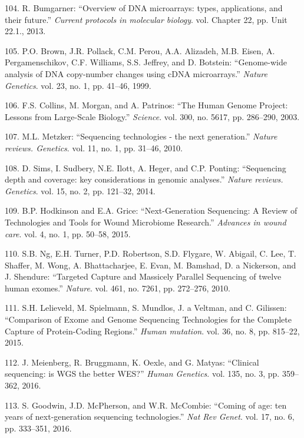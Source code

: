 \documentclass[12pt,a4paper,twoside]{ugathesis}
\theoremstyle{definition}
\theoremstyle{definition}
\theoremstyle{definition}
\theoremstyle{remark}
\begin{document}
\hypertarget{ref-Bumgarner2013}{}
104. R. Bumgarner: ``Overview of DNA microarrays: types, applications,
and their future.'' \emph{Current protocols in molecular biology}. vol.
Chapter 22, pp. Unit 22.1., 2013.

\hypertarget{ref-Brown1999}{}
105. P.O. Brown, J.R. Pollack, C.M. Perou, A.A. Alizadeh, M.B. Eisen, A.
Pergamenschikov, C.F. Williams, S.S. Jeffrey, and D. Botstein:
``Genome-wide analysis of DNA copy-number changes using cDNA
microarrays.'' \emph{Nature Genetics}. vol. 23, no. 1, pp. 41--46, 1999.

\hypertarget{ref-Collins2003}{}
106. F.S. Collins, M. Morgan, and A. Patrinos: ``The Human Genome
Project: Lessons from Large-Scale Biology.'' \emph{Science}. vol. 300,
no. 5617, pp. 286--290, 2003.

\hypertarget{ref-Metzker2010}{}
107. M.L. Metzker: ``Sequencing technologies - the next generation.''
\emph{Nature reviews. Genetics}. vol. 11, no. 1, pp. 31--46, 2010.

\hypertarget{ref-Sims2014}{}
108. D. Sims, I. Sudbery, N.E. Ilott, A. Heger, and C.P. Ponting:
``Sequencing depth and coverage: key considerations in genomic
analyses.'' \emph{Nature reviews. Genetics}. vol. 15, no. 2, pp.
121--32, 2014.

\hypertarget{ref-Hodkinson2015}{}
109. B.P. Hodkinson and E.A. Grice: ``Next-Generation Sequencing: A
Review of Technologies and Tools for Wound Microbiome Research.''
\emph{Advances in wound care}. vol. 4, no. 1, pp. 50--58, 2015.

\hypertarget{ref-Ng2010}{}
110. S.B. Ng, E.H. Turner, P.D. Robertson, S.D. Flygare, W. Abigail, C.
Lee, T. Shaffer, M. Wong, A. Bhattacharjee, E. Evan, M. Bamshad, D. a
Nickerson, and J. Shendure: ``Targeted Capture and Massicely Parallel
Sequencing of twelve human exomes.'' \emph{Nature}. vol. 461, no. 7261,
pp. 272--276, 2010.

\hypertarget{ref-Lelieveld2015}{}
111. S.H. Lelieveld, M. Spielmann, S. Mundlos, J. a Veltman, and C.
Gilissen: ``Comparison of Exome and Genome Sequencing Technologies for
the Complete Capture of Protein-Coding Regions.'' \emph{Human mutation}.
vol. 36, no. 8, pp. 815--22, 2015.

\hypertarget{ref-Meienberg2016}{}
112. J. Meienberg, R. Bruggmann, K. Oexle, and G. Matyas: ``Clinical
sequencing: is WGS the better WES?'' \emph{Human Genetics}. vol. 135,
no. 3, pp. 359--362, 2016.

\hypertarget{ref-Goodwin2016}{}
113. S. Goodwin, J.D. McPherson, and W.R. McCombie: ``Coming of age: ten
years of next-generation sequencing technologies.'' \emph{Nat Rev
Genet}. vol. 17, no. 6, pp. 333--351, 2016.
\end{document}
